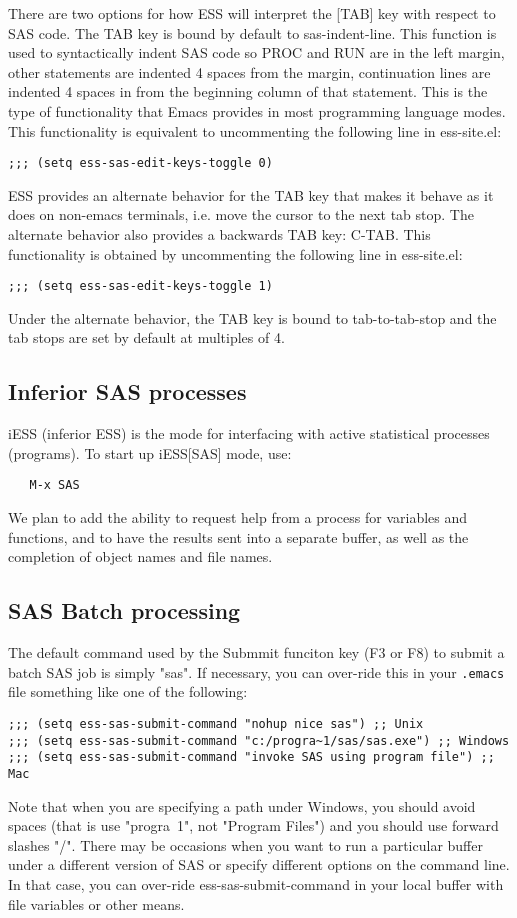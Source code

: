 \documentclass{article}
\begin{document}
There are two options for how ESS will interpret the [TAB] key with
respect to SAS code.  The TAB key is bound by default to
sas-indent-line.  This function is used to syntactically indent SAS
code so PROC and RUN are in the left margin, other statements are
indented 4 spaces from the margin, continuation lines are indented 4
spaces in from the beginning column of that statement.  This is the
type of functionality that Emacs provides in most programming language
modes.  This functionality is equivalent to uncommenting the following
line in ess-site.el:
\begin{verbatim}
;;; (setq ess-sas-edit-keys-toggle 0)
\end{verbatim}

ESS provides an alternate behavior for the TAB key that makes it
behave as it does on non-emacs terminals, i.e. move the cursor to the
next tab stop.  The alternate behavior also provides a backwards TAB
key: C-TAB.  This functionality is obtained by uncommenting the
following line in ess-site.el:
\begin{verbatim}
;;; (setq ess-sas-edit-keys-toggle 1)
\end{verbatim}
Under the alternate behavior, the TAB key is bound to tab-to-tab-stop
and the tab stops are set by default at multiples of 4.

\subsection{Inferior SAS processes}
\label{sec:SAS:proc}

iESS (inferior ESS) is the mode for interfacing with active
statistical processes (programs).  To start up iESS[SAS] mode, use:
\begin{verbatim}
   M-x SAS
\end{verbatim}   
We plan to add the ability to request help from a process for
variables and functions, and to have the results sent into a separate
buffer, as well as the completion of object names and file names.

\subsection{SAS Batch processing}
\label{sec:SAS:batch}

The default command used by the Submmit funciton key (F3 or F8) to
submit a batch SAS job is simply "sas".  If necessary, you can
over-ride this in your \verb+.emacs+ file something like one of the
following:
\begin{verbatim}
;;; (setq ess-sas-submit-command "nohup nice sas") ;; Unix
;;; (setq ess-sas-submit-command "c:/progra~1/sas/sas.exe") ;; Windows
;;; (setq ess-sas-submit-command "invoke SAS using program file") ;; Mac
\end{verbatim}
Note that when you are specifying a path under Windows, you should
avoid spaces (that is use "progra~1", not "Program Files") and you
should use forward slashes "/".  There may be occasions when you want
to run a particular buffer under a different version of SAS or specify
different options on the command line.  In that case, you can
over-ride ess-sas-submit-command in your local buffer with file
variables or other means.
\end{document}

